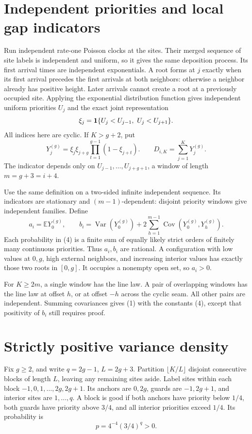 \documentclass[11pt]{article}
\newcommand{\E}{\mathbb E}
\newcommand{\Var}{\operatorname{Var}}
\newcommand{\Cov}{\operatorname{Cov}}
\begin{document}
\section*{Independent priorities and local gap indicators}
Run independent rate-one Poisson clocks at the sites. Their merged
sequence of site labels is independent and uniform, so it gives the
same deposition process. Its first arrival times are independent
exponentials. A root forms at \(j\) exactly when its first arrival
precedes the first arrivals at both neighbors: otherwise a neighbor
already has positive height. Later arrivals cannot create a root at
a previously occupied site. Applying the exponential distribution
function gives independent uniform priorities \(U_j\) and the exact
joint representation
\[
 \xi_j={\bf1}\{U_j<U_{j-1},\ U_j<U_{j+1}\}.
\]
All indices here are cyclic. If \(K>g+2\), put
\[
 Y_j^{(g)}=\xi_j\xi_{j+g}
              \prod_{t=1}^{g-1}(1-\xi_{j+t}).
 \qquad D_{i,K}=\sum_{j=1}^K Y_j^{(g)}.                       \tag{3}
\]
The indicator depends only on
\(U_{j-1},\ldots,U_{j+g+1}\), a window of length
\(m=g+3=i+4\).

Use the same definition on a two-sided infinite independent sequence.
Its indicators are stationary and \((m-1)\)-dependent: disjoint
priority windows give independent families. Define
\[
 a_i=\E Y_0^{(g)},\qquad
 b_i=\Var(Y_0^{(g)})
       +2\sum_{h=1}^{m-1}\Cov(Y_0^{(g)},Y_h^{(g)}).           \tag{4}
\]
Each probability in (4) is a finite sum of equally likely strict
orders of finitely many continuous priorities. Thus \(a_i,b_i\) are
rational. A configuration with low values at \(0,g\), high external
neighbors, and increasing interior values has exactly those two
roots in \([0,g]\). It occupies a nonempty open set, so \(a_i>0\).

For \(K\geq2m\), a single window has the line law. A pair of overlapping
windows has the line law at offset \(h\), or at offset \(-h\) across the
cyclic seam. All other pairs are independent. Summing covariances gives
(1) with the constants (4), except that positivity of \(b_i\) still
requires proof.

\section*{Strictly positive variance density}
Fix \(g\geq2\), and write \(q=2g-1\), \(L=2g+3\).
Partition \(\lfloor K/L\rfloor\) disjoint consecutive blocks of length
\(L\), leaving any remaining sites aside. Label sites within each block
\(-1,0,1,\ldots,2g,2g+1\). Its anchors are \(0,2g\), guards are
\(-1,2g+1\), and interior sites are \(1,\ldots,q\).
A block is good if both anchors have priority below \(1/4\), both guards
have priority above \(3/4\), and all interior priorities exceed \(1/4\).
Its probability is
\[
 p=4^{-4}(3/4)^q>0.                                         \tag{5}
\]
\end{document}
